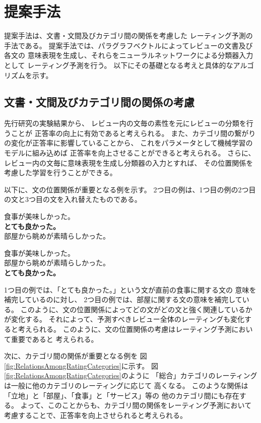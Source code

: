 \section{提案手法} \label{sec:ProposedMethod}

提案手法は、文書・文間及びカテゴリ間の関係を考慮した
レーティング予測の手法である。
提案手法では、パラグラフベクトルによってレビューの文書及び各文の
意味表現を生成し、それらをニューラルネットワークによる分類器入力として
レーティング予測を行う。
以下にその基礎となる考えと具体的なアルゴリズムを示す。


\subsection{文書・文間及びカテゴリ間の関係の考慮}

先行研究\cite{fujitani15}の実験結果から、
レビュー内の文毎の素性を元にレビューの分類を行うことが
正答率の向上に有効であると考えられる。
また、カテゴリ間の繋がりの変化が正答率に影響していることから、
これをパラメータとして機械学習のモデルに組み込めば
正答率を向上させることができると考えられる。
さらに、レビュー内の文毎に意味表現を生成し分類器の入力とすれば、
その位置関係を考慮した学習を行うことができる。

以下に、文の位置関係が重要となる例を示す。
2つ目の例は、1つ目の例の2つ目の文と3つ目の文を入れ替えたものである。
\begin{addmargin}{8ex}
  \vspace{1em}
  食事が美味しかった。 \\
  \textbf{とても良かった。} \\
  部屋から眺めが素晴らしかった。
\end{addmargin}
\begin{addmargin}{8ex}
  \vspace{1em}
  食事が美味しかった。 \\
  部屋から眺めが素晴らしかった。 \\
  \textbf{とても良かった。}
\end{addmargin}
1つ目の例では、「とても良かった。」という文が直前の食事に関する文の
意味を補完しているのに対し、
2つ目の例では、部屋に関する文の意味を補完している。
このように、文の位置関係によってどの文がどの文と強く関連しているかが変化する。
それによって、予測すべきレビュー全体のレーティングも変化すると考えられる。
このように、文の位置関係の考慮はレーティング予測において重要であると
考えられる。

次に、カテゴリ間の関係が重要となる例を
図\ref{fig:RelationsAmongRatingCategories}に示す。
図\ref{fig:RelationsAmongRatingCategories}のように
「総合」カテゴリのレーティングは一般に他のカテゴリのレーティングに応じて
高くなる。
このような関係は「立地」と「部屋」、「食事」と「サービス」等の
他のカテゴリ間にも存在する。
よって、このことからも、カテゴリ間の関係をレーティング予測において
考慮することで、正答率を向上させられると考えられる。

